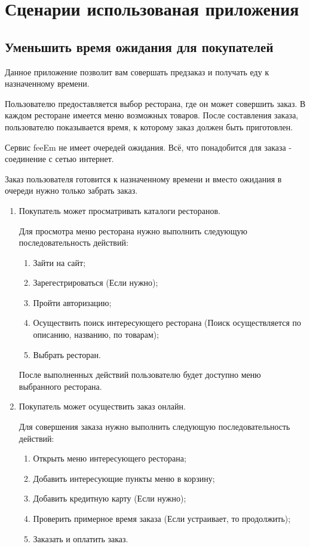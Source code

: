 \section{Сценарии использованая приложения}
{
\subsection{Уменьшить время ожидания для покупателей}
{
Данное приложение позволит вам совершать предзаказ и получать еду к назначенному времени.

Пользователю предоставляется выбор ресторана, где он может совершить заказ. В каждом ресторане имеется меню возможных товаров. После составления заказа, пользователю показывается время, к которому заказ должен быть приготовлен.

Сервис feeEm не имеет очередей ожидания. Всё, что понадобится для заказа - соединение с сетью интернет.

Заказ пользователя готовится к назначенному времени и вместо ожидания в очереди нужно только забрать заказ.

\begin{enumerate}
  \item {
    Покупатель может просматривать каталоги ресторанов.

    Для просмотра меню ресторана нужно выполнить следующую последовательность действий:

      \begin{enumerate}[label*=\arabic*.]
      \item Зайти на сайт;
      \item Зарегестрироваться (Если нужно);
      \item Пройти авторизацию;
      \item Осуществить поиск интересующего ресторана (Поиск осуществляется по описанию, названию, по товарам);
      \item Выбрать ресторан.
      \end{enumerate}

    После выполненных действий пользователю будет доступно меню выбранного ресторана.
  }

  \item {
    Покупатель может осуществить заказ онлайн.

    Для совершения заказа нужно выполнить следующую последовательность действий:

    \begin{enumerate}[label*=\arabic*.]
      \item Открыть меню интересующего ресторана;
      \item Добавить интересующие пункты меню в корзину;
      \item Добавить кредитную карту (Если нужно);
      \item Проверить примерное время заказа (Если устраивает, то продолжить);
      \item Заказать и оплатить заказ.
    \end{enumerate}
  }


\end{enumerate}}}
